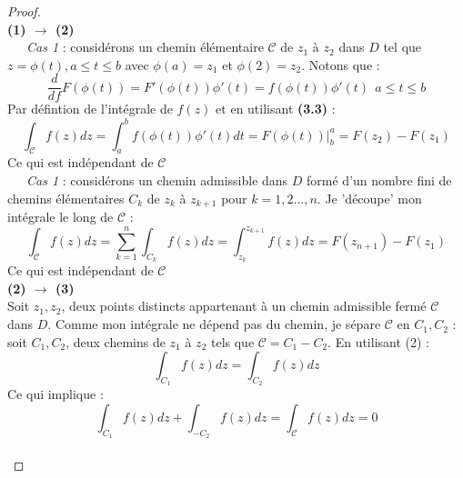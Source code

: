     \newpage
    \begin{proof}\ \\
    \textbf{(1) $\rightarrow$ (2)}\\
    \ \ \ \textit{Cas 1} : considérons un chemin élémentaire $\mathcal{C}$ de $z_1$ à
    $z_2$ dans $D$ tel que $z = \phi(t), a\leq t\leq b$ avec $\phi(a) = z_1$ et $\phi(
    2) = z_2$. Notons que : 
    \begin{equation}
    \frac{d}{df}F(\phi(t)) = F'(\phi(t))\phi'(t) = f(\phi(t))\phi'(t)\ \ a \leq t\leq b
    \end{equation}
    Par défintion de l'intégrale de $f(z)$ et en utilisant \textbf{(3.3)} :
    \begin{equation}
    \int_\mathcal{C} f(z) dz = \int_a^b f(\phi(t))\phi'(t) dt = F(\phi(t))|_b^a = F(z_2)
    - F(z_1)
    \end{equation}
    Ce qui est indépendant de $\mathcal{C}$\\
    
    \ \ \ \textit{Cas 1} : considérons un chemin admissible dans $D$ formé d'un nombre
    fini de chemins élémentaires $C_k$ de $z_k$ à $z_{k+1}$ pour $k=1,2\dots,n.$ Je
    'découpe' mon intégrale le long de $\mathcal{C}$ :
    \begin{equation}
    \int_\mathcal{C} f(z) dz = \sum_{k=1}^n \int_{C_k} f(z)dz = \int_{z_k}^{z_{k+1}}
    f(z)dz = F(z_{n+1}) - F(z_1)
    \end{equation}
    Ce qui est indépendant de $\mathcal{C}$\\
    
    \textbf{(2) $\rightarrow$ (3)}\\
    Soit $z_1,z_2$, deux points distincts appartenant à un chemin admissible fermé 
    $\mathcal{C}$ dans $D$. Comme mon intégrale ne dépend pas du chemin, je sépare
    $\mathcal{C}$ en $C_1,C_2$ : soit $C_1,C_2$, deux chemins de $z_1$ à $z_2$ tels
    que $\mathcal{C} = C_1-C_2$. En utilisant (2) :
    \begin{equation}
    \int_{C_1} f(z) dz = \int_{C_2} f(z) dz
    \end{equation}
    Ce qui implique : 
    \begin{equation}
    \int_{C_1} f(z) dz + \int_{-C_2} f(z) dz = \int_\mathcal{C}f(z) dz = 0
    \end{equation}\ \\
    

\end{proof}
